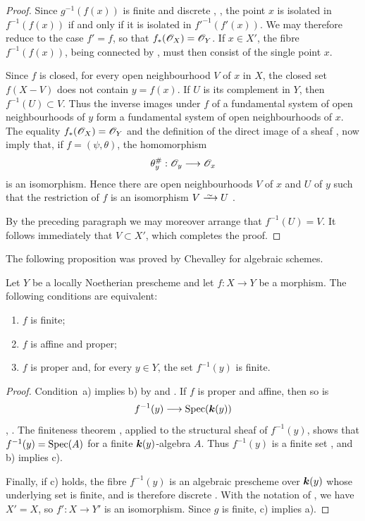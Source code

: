 \begin{proof}
Since $g^{-1}(f(x))$ is finite and discrete
, , the point $x$ is isolated in
$f^{-1}(f(x))$ if and only if it is isolated in
$f'^{-1}(f'(x))$.  We may therefore reduce to the case $f'=f$, so
that $f_*(\mathscr{O}_X)=\mathscr{O}_Y$.  If $x\in X'$, the fibre
$f^{-1}(f(x))$, being connected by , must then
consist of the single point $x$.

Since $f$ is closed, for every open neighbourhood $V$ of $x$ in
$X$, the closed set $f(X-V)$ does not contain $y=f(x)$.  If $U$ is
its complement in $Y$, then $f^{-1}(U)\subset V$.  Thus the inverse
images under $f$ of a fundamental system of open neighbourhoods of
$y$ form a fundamental system of open neighbourhoods of $x$.
The equality $f_*(\mathscr{O}_X)=\mathscr{O}_Y$ and the definition of the
direct image of a sheaf ,  now
imply that, if $f=(\psi,\theta)$, the homomorphism
\[
  \theta_y^\#:\mathscr{O}_y\longrightarrow\mathscr{O}_x
\]
is an isomorphism.  Hence there are open neighbourhoods $V$ of $x$
and $U$ of $y$ such that the restriction of $f$ is an isomorphism
$V\isoto U$ .


By the preceding paragraph we may moreover arrange that
$f^{-1}(U)=V$.  It follows immediately that $V\subset X'$, which
completes the proof.
\end{proof}

The following proposition was proved by Chevalley for algebraic
schemes.

\begin{proposition}[4.4.2]
\label{III.4.4.2}
Let $Y$ be a locally Noetherian prescheme and let $f:X\to Y$ be a
morphism.  The following conditions are equivalent:
\begin{enumerate}
  \item[{\rm a)}] $f$ is finite;
  \item[{\rm b)}] $f$ is affine and proper;
  \item[{\rm c)}] $f$ is proper and, for every $y\in Y$, the set
    $f^{-1}(y)$ is finite.
\end{enumerate}
\end{proposition}

\begin{proof}
Condition~a) implies b) by  and
.  If $f$ is proper and affine, then so is
\[
  f^{-1}(y)\longrightarrow\operatorname{Spec}(\boldsymbol{k}(y))
\]
, .  The finiteness theorem
, applied to the structural sheaf of $f^{-1}(y)$,
shows that $f^{-1}(y)=\operatorname{Spec}(A)$ for a finite
$\boldsymbol{k}(y)$-algebra $A$.  Thus $f^{-1}(y)$ is a finite set
, and b) implies c).

Finally, if c) holds, the fibre $f^{-1}(y)$ is an algebraic
prescheme over $\boldsymbol{k}(y)$ whose underlying set is finite, and is
therefore discrete .  With the notation of
, we have $X'=X$, so
$f':X\to Y'$ is an isomorphism.  Since $g$ is finite, c) implies
a).
\end{proof}

